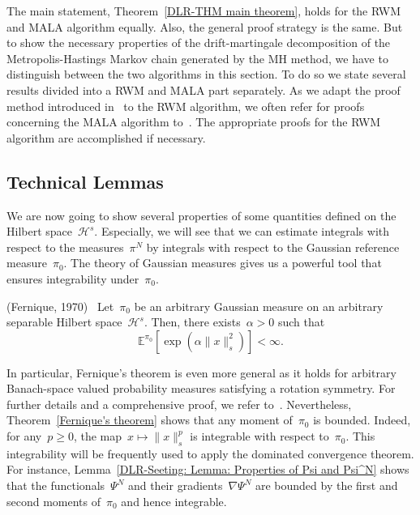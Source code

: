 The main statement, Theorem~\ref{DLR-THM main theorem}, holds for the RWM and MALA algorithm equally. Also, the general proof strategy is the same. But to show the necessary properties of the drift-martingale decomposition of the Metropolis-Hastings Markov chain generated by the MH method, we have to distinguish between the two algorithms in this section. To do so we state several results divided into a RWM and MALA part separately. As we adapt the proof method introduced in~\autocite{Pillai2012} to the RWM algorithm, we often refer for proofs concerning the MALA algorithm to~\autocite{Pillai2012}. The appropriate proofs for the RWM algorithm are accomplished if necessary.



\subsection{Technical Lemmas} 
\label{sec:sub: DLR - Tehnical Lemmas}

We are now going to show several properties of some quantities defined on the Hilbert space~$\mathcal{H}^s$. Especially, we will see that we can estimate integrals with respect to the measures~$\pi^N$ by integrals with respect to the Gaussian reference measure~$\pi_0$. The theory of Gaussian measures gives us a powerful tool that ensures integrability under~$\pi_0$.

\begin{thm}(Fernique, 1970)~\autocite[Theorem 3.11]{Hairer2009}
  \label{Fernique's theorem}
 Let~$\pi_0$ be an arbitrary Gaussian measure on an arbitrary separable Hilbert space~$\mathcal{H}^s$. Then, there exists~$\alpha >0$ such that
 \begin{equation*}
   \mathbb{E}^{\pi_0}[ \exp (\alpha \| x \|_s^2 ) ] < \infty.
 \end{equation*}
 
\end{thm}

In particular, Fernique's theorem is even more general as it holds for arbitrary Banach-space valued probability measures satisfying a rotation symmetry. For further details and a comprehensive proof, we refer to~\autocite[Theorem 3.11]{Hairer2009}. Nevertheless, Theorem~\ref{Fernique's theorem} shows that any moment of~$\pi_0$ is bounded. Indeed, for any~$p \geq 0$,  the map~$x \mapsto \|x\|_s^p$ is integrable with respect to~$\pi_0$. This integrability will be frequently used to apply the dominated convergence theorem. For instance, Lemma~\ref{DLR-Seeting: Lemma: Properties of Psi and Psi^N} shows that the functionals~$\Psi^N$ and their gradients~$\nabla \Psi^N$ are bounded by the first and second moments of~$\pi_0$ and hence integrable.


